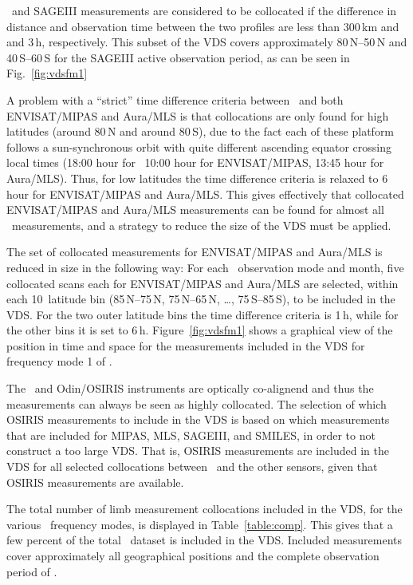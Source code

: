 \smr\ and SAGEIII measurements are considered to be collocated if the 
difference in distance and observation time between the two profiles are
less than 300\,km and and 3\,h, respectively.
This subset of the VDS covers approximately 80\degree\,N--50\degree\,N and
40\degree\,S--60\degree\,S for the SAGEIII active observation period, as can
be seen in Fig.~\ref{fig:vdsfm1}

A problem with a ``strict'' time difference criteria
between \smr\ and both ENVISAT/MIPAS and Aura/MLS
is that collocations are only found for high latitudes
 (around 80\degree\,N and around 80\degree\,S),
due to the fact each of these platform follows a sun-synchronous orbit
with quite different ascending equator crossing local times  
(18:00 hour for \smr\, 10:00 hour for ENVISAT/MIPAS,
 13:45 hour for Aura/MLS). 
Thus, for low latitudes the time difference criteria
is relaxed to 6\,hour for ENVISAT/MIPAS and Aura/MLS.
This gives effectively that collocated ENVISAT/MIPAS and Aura/MLS 
measurements can be found for almost all \smr\ measurements, and a strategy
to reduce the size of the VDS must be applied.

The set of collocated measurements for ENVISAT/MIPAS and Aura/MLS is reduced
in size in the following way:
For each \smr\ observation mode and month, five collocated scans each
for ENVISAT/MIPAS and Aura/MLS
are selected, within each 10\degree\ latitude bin
(85\degree\,N--75\degree\,N, 75\degree\,N--65\degree\,N, \ldots, 75\degree\,S--85\degree\,S),
to be included in the VDS. For the two outer latitude bins the
time difference criteria is 1\,h, while for the other bins it is set to 6\,h.
Figure~\ref{fig:vdsfm1} shows a graphical view of the position in
time and space for the measurements included in the VDS for
frequency mode 1 of \smr.   

The \smr\ and Odin/OSIRIS instruments are optically co-alignend and thus
the measurements can always be seen as highly collocated.
The selection of which OSIRIS measurements to include in the
VDS is based on which measurements that are included 
for MIPAS, MLS, SAGEIII, and SMILES, in order to not
construct a too large VDS.  That is,
OSIRIS measurements are included in the VDS for all selected
collocations between \smr\ and the other sensors, given
that OSIRIS measurements are available. 

The total number of limb measurement collocations included in the VDS, for the various 
\smr\ frequency modes, is displayed in Table~\ref{table:comp}. This gives that a few 
percent of the total \smr\ dataset is included in the VDS. Included measurements cover 
approximately all geographical positions and the complete observation period of \smr.

